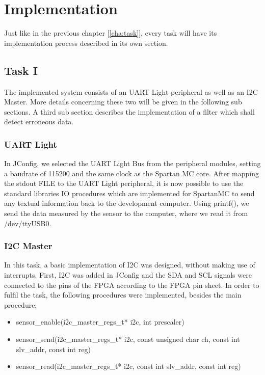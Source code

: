 \chapter{Implementation} %
\label{cha:impl}
	Just like in the previous chapter [\ref{cha:task}], every task will have its implementation process described in its own section.

	\section{Task I} %
	\label{sec:impl_task_1}
		The implemented system consists of an UART Light peripheral as well as an I2C Master. More details concerning these two will be given in the following sub sections. A third sub section describes the implementation of a filter which shall detect erroneous data.
	
		\subsection{UART Light} %
		\label{sub:uart_light}
			In JConfig, we selected the UART Light Bus from the peripheral modules, setting a baudrate of 115200 and the same clock as the Spartan MC core. After mapping the stdout FILE to the UART Light peripheral, it is now possible to use the standard libraries IO procedures which are implemented for SpartanMC to send any textual information back to the development computer.
			Using printf(), we send the data measured by the sensor to the computer, where we read it from /dev/ttyUSB0.

		\subsection{I2C Master} %
		\label{i2c_master}
			In this task, a basic implementation of I2C was designed, without making use of interrupts. First, I2C was added in JConfig and the SDA and SCL signals were connected to the pins of the FPGA according to the FPGA pin sheet.
			In order to fulfil the task, the following procedures were implemented, besides the main procedure:
			
			\begin{itemize}
				\item sensor\_enable(i2c\_master\_regs\_t* i2c, int prescaler)
				\item sensor\_send(i2c\_master\_regs\_t* i2c, const unsigned char ch, const int slv\_addr, const int reg)
				\item sensor\_read(i2c\_master\_regs\_t* i2c, const int slv\_addr, const int reg)
		   	\end{itemize}
			
